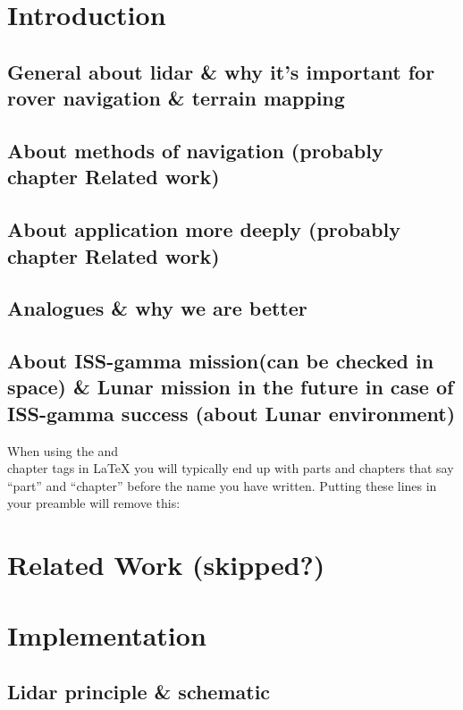 \chapter{Introduction}

\section{General about lidar \& why it's important for rover navigation \& terrain mapping}
\section{About methods of navigation (probably chapter Related work)} 
\section{About application more deeply (probably chapter Related work)}
\section{Analogues \& why we are better}
\section{About ISS-gamma mission(can be checked in space) \& Lunar mission in the future in case of ISS-gamma success (about Lunar environment)}
When using the  and \\chapter tags in LaTeX you will typically end up with parts and chapters that say “part” and “chapter” before the name you have written. Putting these lines in your preamble will remove this:

\chapter{Related Work (skipped?)}

\chapter{Implementation}
\section{Lidar principle \& schematic}
